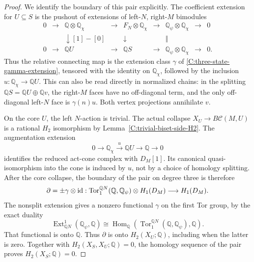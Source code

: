 \begin{proof}
We identify the boundary of this pair explicitly.
The coefficient extension for $U\subseteq S$ is the pushout
of extensions of left-$N$, right-$M$ bimodules
\[
\begin{array}{ccccccccc}
0&\to&\mathbb Q\otimes\mathbb Q_\chi&\to&
 F_N\otimes\mathbb Q_\chi&\to&
 \mathbb Q_\psi\otimes\mathbb Q_\chi&\to&0\\
 &&\downarrow [1]-[0]&&\downarrow&&\Vert\\
0&\to&\mathbb QU&\to&\mathbb QS&\to&
 \mathbb Q_\psi\otimes\mathbb Q_\chi&\to&0.
\end{array}
\]
Thus the relative connecting map is the extension class
$\gamma$ of \eqref{C:three-state-gamma-extension}, tensored
with the identity on $\mathbb Q_\chi$, followed by the
inclusion $u:\mathbb Q_\chi\to\mathbb QU$.
This can also be read directly in normalized chains: in the
splitting $\mathbb QS=\mathbb QU\oplus\mathbb Qv$, the
right-$M$ faces have no off-diagonal term, and the only
off-diagonal left-$N$ face is $\gamma(n)u$.
Both vertex projections annihilate $v$.

On the core $U$, the left $N$-action is trivial.
The actual collapse $X_U\to B\mathcal C(M,U)$ is a rational
$H_2$ isomorphism by Lemma~\ref{C:trivial-biset-side-H2}.
The augmentation extension
\[
0\longrightarrow\mathbb Q_\chi
 \xrightarrow{u}\mathbb QU\longrightarrow\mathbb Q
 \longrightarrow0
\]
identifies the reduced act-cone complex with $D_M[1]$.
Its canonical quasi-isomorphism into the cone is induced by
$u$, not by a choice of homology splitting.  After the core
collapse, the boundary of the pair on degree three is therefore
\[
 \partial=\pm\gamma\otimes\mathrm {id}:
 \operatorname{Tor}^{\mathbb QN}_1(\mathbb Q,\mathbb Q_\psi)
 \otimes H_1(D_M)\longrightarrow H_1(D_M).
\]
The nonsplit extension gives a nonzero functional
$\gamma$ on the first Tor group, by the exact duality
\[
 \operatorname{Ext}^1_{\mathbb QN}(\mathbb Q_\psi,\mathbb Q)
 \cong
 \operatorname{Hom}_{\mathbb Q}\!\left(
   \operatorname{Tor}^{\mathbb QN}_1(\mathbb Q,\mathbb Q_\psi),
   \mathbb Q\right).
\]
That functional is onto $\mathbb Q$.  Thus $\partial$ is
onto $H_2(X_U;\mathbb Q)$, including when the latter is zero.
Together with $H_2(X_S,X_U;\mathbb Q)=0$, the homology
sequence of the pair proves $H_2(X_S;\mathbb Q)=0$.
\end{proof}


